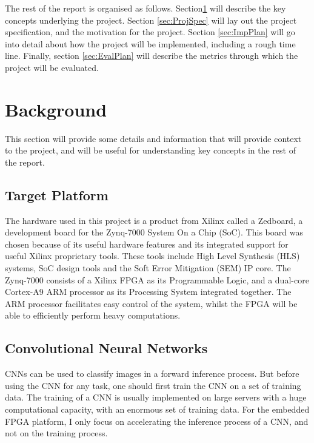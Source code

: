 \documentclass[12pt]{article}
\begin{document}
The rest of the report is organised as follows. Section\ref{sec:Background} will describe the key concepts underlying the project. Section \ref{sec:ProjSpec} will lay out the project specification, and the motivation for the project. Section \ref{sec:ImpPlan} will go into detail about how the project will be implemented, including a rough time line. Finally, section \ref{sec:EvalPlan} will describe the metrics through which the project will be evaluated.

\section{Background}
\label{sec:Background}
\vspace{-12pt}

This section will provide some details and information that will provide context to the project, and will be useful for understanding key concepts in the rest of the report.

\subsection{Target Platform}
\label{sec:Background-TargetPlatform}
\vspace{-12pt}

The hardware used in this project is a product from Xilinx called a Zedboard, a development board for the Zynq-7000 System On a Chip (SoC). This board was chosen because of its useful hardware features and its integrated support for useful Xilinx proprietary tools. These tools include High Level Synthesis (HLS) systems, SoC design tools and the Soft Error Mitigation (SEM) IP core. The Zynq-7000 consists of a Xilinx FPGA as its Programmable Logic, and a dual-core Cortex-A9 ARM processor as its Processing System integrated together. The ARM processor facilitates easy control of the system, whilst the FPGA will be able to efficiently perform heavy computations.

\subsection{Convolutional Neural Networks}
\label{sec:Background-CNN}
\vspace{-12pt}

CNNs can be used to classify images in a forward inference process. But before using the CNN for any task, one should first train the CNN on a set of training data. The training of a CNN is usually implemented on large servers with a huge computational capacity, with an enormous set of training data. For the embedded FPGA platform, I only focus on accelerating the inference process of a CNN, and not on the training process.
\end{document}
